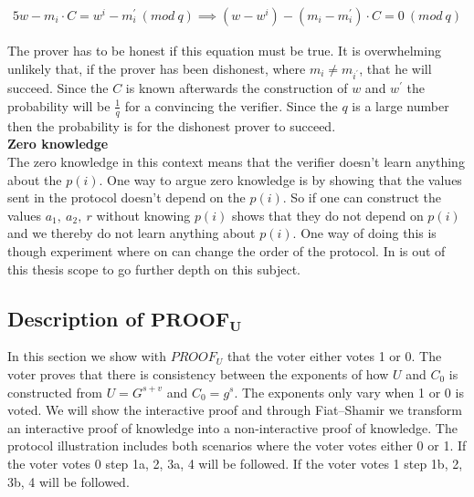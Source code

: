 \begin{alignat*}{5}
w-m_i \cdot C = w^i-m_i^{'}\ (mod\ q) \implies (w-w^i)-(m_i - m_i^{'})  \cdot  C = 0 \ (mod\ q) 
\end{alignat*}


\noindent
The prover has to be honest if this equation must be true. It is overwhelming unlikely that, if the prover has been dishonest, where $m_i \neq m_{i^{'}}$, that he will succeed. Since the $C$ is known afterwards the construction of $w$ and $w^{'}$ the probability will be \begin{math} \frac{1}{q}\end{math} for a convincing the verifier. Since the $q$ is a large number then the probability is for the dishonest prover to succeed.\\


\noindent
\textbf{Zero knowledge}\\
The zero knowledge in this context means that the verifier doesn't learn anything about the $p(i)$. One way to argue zero knowledge is by showing that the values sent in the protocol doesn't depend on the $p(i)$. So if one can construct the values $a_1, \ a_2, \ r$  without knowing  $p(i)$  shows that they do not depend on $p(i)$ and we thereby do not learn anything about $p(i)$. One way of doing this is though experiment where on can change the order of the protocol. In is out of this thesis scope to go further depth on this subject.\\

 

\subsection{Description of $ \mathbf{PROOF_U} $} \label{sec:proof_u}
In this section we show with $PROOF_U$ that the voter either votes  1 or 0. The voter proves that there is consistency between the exponents of how \begin{math}U\end{math} and \begin{math}C_0\end{math} is constructed from \begin{math}U=G^{s+v}\end{math} and \begin{math}C_0 = g^s\end{math}. The exponents only vary when 1 or 0 is voted. We will show the interactive proof and through Fiat–Shamir  we transform an interactive proof of knowledge into a non-interactive proof of knowledge. The protocol illustration includes both scenarios where the voter votes either 0 or 1. If the voter votes 0 step 1a, 2, 3a, 4 will be followed. If the voter votes 1 step 1b, 2, 3b, 4 will be followed.\\


